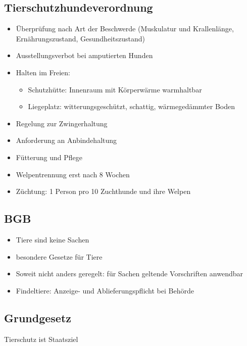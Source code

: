     \subsection{Tierschutzhundeverordnung}
        \begin{itemize}
            \item Überprüfung nach Art der Beschwerde (Muskulatur und Krallenlänge, Ernährungszustand, Gesundheitszustand)
            \item Ausstellungsverbot bei amputierten Hunden
            \item Halten im Freien:
            \begin{itemize}
                \item Schutzhütte: Innenraum mit Körperwärme warmhaltbar
                \item Liegeplatz: witterungsgeschützt, schattig, wärmegedämmter Boden
            \end{itemize}
            \item Regelung zur Zwingerhaltung
            \item Anforderung an Anbindehaltung
            \item Fütterung und Pflege
            \item Welpentrennung erst nach 8 Wochen
            \item Züchtung: 1 Person pro 10 Zuchthunde und ihre Welpen
        \end{itemize}

    \subsection{BGB}
        \begin{itemize}
            \item Tiere sind keine Sachen
            \item besondere Gesetze für Tiere
            \item Soweit nicht anders geregelt: für Sachen geltende Vorschriften anwendbar
            \item Findeltiere: Anzeige- und Ablieferungspflicht bei Behörde
        \end{itemize}

    \subsection{Grundgesetz}

        Tierschutz ist Staatsziel
